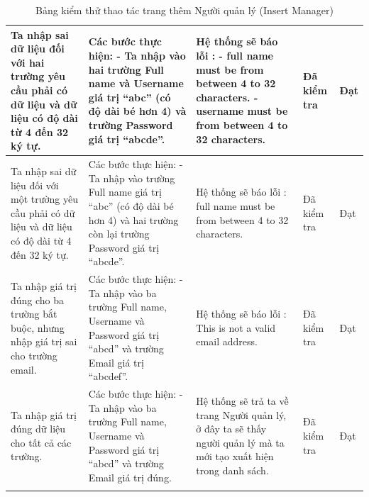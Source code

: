\documentclass[a4paper]{article}
\begin{document}
\begin{longtable}{ | p{} |p{} | p{}  | p{}  | p{}  | }
\hline
Ta nhập sai dữ liệu đối với hai trường yêu cầu phải có dữ liệu và dữ liệu có độ dài từ 4 đến 32 ký tự. &
Các bước thực hiện: \newline
- Ta nhập vào hai trường Full name và Username giá trị “abc” (có độ dài bé hơn 4) và trường Password giá trị “abcde”.   \newline
&
Hệ thống sẽ báo lỗi : \newline
- full name must be from between 4 to 32 characters. \newline
- username must be from between 4 to 32 characters.
&
Đã kiểm tra &
Đạt \\

\hline
Ta nhập sai dữ liệu đối với một trường yêu cầu phải có dữ liệu và dữ liệu có độ dài từ 4 đến 32 ký tự. &
Các bước thực hiện: \newline
- Ta nhập vào trường Full name giá trị “abc” (có độ dài bé hơn 4) và hai trường còn lại trường Password giá trị “abcde”.     \newline
&
Hệ thống sẽ báo lỗi : full name must be from between 4 to 32 characters.
&
Đã kiểm tra &
Đạt \\

\hline
Ta nhập giá trị đúng cho ba trường bắt buộc, nhưng nhập giá trị sai cho trường email. &
Các bước thực hiện: \newline
- Ta nhập vào ba trường Full name, Username và Password giá trị “abcd” và trường Email giá trị “abcdef”.     \newline
&
Hệ thống sẽ báo lỗi : This is not a valid email address.
&
Đã kiểm tra &
Đạt \\

\hline
Ta nhập giá trị đúng dữ liệu cho tất cả các trường. &
Các bước thực hiện: \newline
- Ta nhập vào ba trường Full name, Username và Password giá trị “abcd” và trường Email giá trị đúng.     \newline
&
Hệ thống sẽ trả ta về trang Người quản lý, ở đây ta sẽ thấy người quản lý mà ta mới tạo xuất hiện trong danh sách.
&
Đã kiểm tra &
Đạt \\

\hline
\caption{Bảng kiểm thử thao tác trang thêm Người quản lý (Insert Manager)}
\end{longtable}


\end{document}
